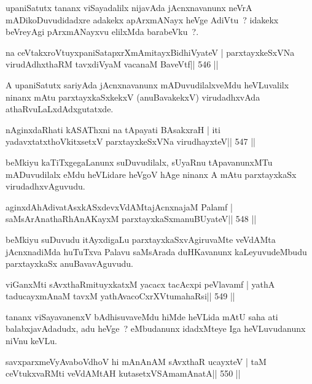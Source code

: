 \begin{artha}
upaniSatutx tananx viSayadalilx nijavAda jAcnxnavanunx neVrA mADikoDuvudidadxre adakekx apArxmANayx heVge AdiVtu~? idakekx beVreyAgi pArxmANayxvu elilxMda barabeVku~?.
\end{artha}

\begin{shl}
na ceVtakxroVtuyxpaniSatapxrXmAmitayxBidhiVyateV |
parxtayxkeSxVNa virudAdhxthaRM tavxdiVyaM vacanaM BaveVtf\hfill || 546 ||
\end{shl}

\begin{artha}
A upaniSatutx sariyAda jAcnxnavanunx mADuvudilalxveMdu heVLuvalilx ninanx mAtu parxtayxkaSxkekxV (anuBavakekxV) virudadhxvAda athaRvuLaLxdAdxgutatxde.
\end{artha}

\begin{shl}
nAginxdaRhati kASAThxni na tApayati BAsakxraH |
iti yadavxtatxthoVkitxsetxV parxtayxkeSxVNa virudhayxteV\hfill || 547 ||
\end{shl}

\begin{artha}
beMkiyu kaTiTxgegaLanunx suDuvudilalx, sUyaRnu tApavanunxMTu mADuvudilalx eMdu heVLidare heVgoV hAge ninanx A mAtu parxtayxkaSx virudadhxvAguvudu.
\end{artha}

\begin{shl}
aginxdAhAdivatAsxkASxdevxVdAMtajAcnxnajaM Palamf |
saMsArAnathaRhAnAKayxM parxtayxkaSxmanuBUyateV\hfill || 548 ||
\end{shl}

\begin{artha}
beMkiyu suDuvudu itAyxdigaLu parxtayxkaSxvAgiruvaMte veVdAMta jAcnxnadiMda huTuTxva Palavu saMsArada duHKavanunx kaLeyuvudeMbudu parxtayxkaSx anuBavavAguvudu.
\end{artha}

\begin{shl}
viGanxMti sAvxthaRmituyxkatxM yacacx tacAcxpi peVlavamf |
yathA taducayxmAnaM tavxM yathAvacoCxrXVtumahaRsi\hfill || 549 ||
\end{shl}

\begin{artha}
tananx viSayavanenxV bAdhisuvaveMdu hiMde heVLida mAtU saha ati
balabxjavAdadudx, adu heVge~? eMbudanunx idadxMteye Iga heVLuvudanunx
niVnu keVLu.
\end{artha}

\begin{shl}
savxparxmeVyAvaboVdhoV hi mAnAnAM sAvxthaR ucayxteV |
taM ceVtukxvaRMti veVdAMtAH kutasetxVSAmamAnatA\hfill || 550 ||
\end{shl}

